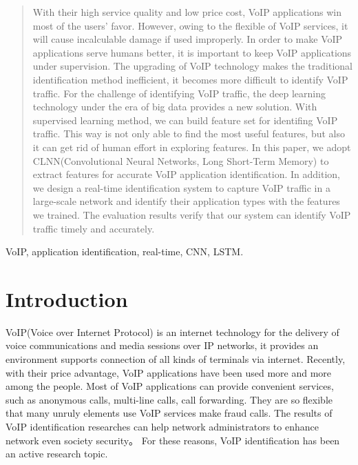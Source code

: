 \documentclass[conference]{IEEEtran}
\begin{document}
\begin{abstract}
  With their high service quality and low price cost, VoIP applications win most of the users' favor. However, owing to the flexible of VoIP services, it will cause incalculable damage if used improperly. In order to make VoIP applications serve humans better, it is important to keep VoIP applications under supervision. The upgrading of VoIP technology makes the traditional identification method inefficient, it becomes more difficult to identify VoIP traffic. For the challenge of identifying VoIP traffic, the deep learning technology under the era of big data provides a new solution. With supervised learning method, we can build feature set for identifing VoIP
  traffic. This way is not only able to find the most useful features, but also it can get rid of human effort in exploring features. In this paper, we adopt CLNN(Convolutional Neural Networks, Long Short-Term Memory) to extract features for accurate VoIP application identification. In addition, we design a real-time identification system to capture VoIP traffic in a large-scale network and identify their application types with the features we trained. The evaluation results verify that our system can identify VoIP traffic timely and accurately.

\end{abstract}

\begin{IEEEkeywords}
VoIP, application identification, real-time, CNN, LSTM.
\end{IEEEkeywords}

\section{Introduction}
\label{intro}
VoIP(Voice over Internet Protocol) is an internet technology for the delivery of voice communications and media sessions over IP networks, it provides an environment supports connection of all kinds of terminals via internet. Recently, with their price advantage, VoIP applications have been used more and more among the people. Most of VoIP applications can provide convenient services, such as anonymous calls, multi-line calls, call forwarding. They are so flexible that many unruly elements use VoIP services make fraud calls. The results of VoIP identification researches can help network administrators to enhance network even society security。 For these reasons, VoIP identification has been an active research topic.
\end{document}
